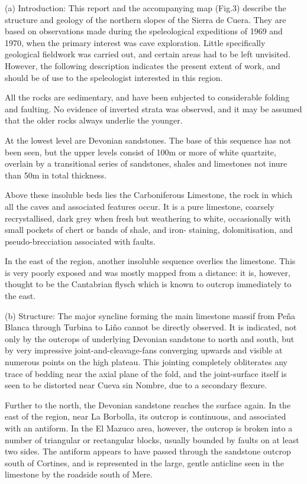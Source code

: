 \documentclass[11pt, a4paper, twoside]{memoir}
\begin{document}
(a) Introduction: This report and the accompanying map (Fig.3) describe the structure and geology of the northern slopes of the Sierra de Cuera. They are based on observations made during the speleological expeditions of 1969 and 1970, when the primary interest was cave exploration. Little specifically geological fieldwork was carried out, and certain areas had to be left unvisited. However, the following description indicates the present extent of work, and should be of use to the speleologist interested in this region.

All the rocks are sedimentary, and have been subjected to considerable folding and faulting. No evidence of inverted strata was observed, and it may be assumed that the older rocks always underlie the younger.

At the lowest level are Devonian sandstones. The base of this sequence has not been seen, but the upper levels consist of 100m or more of white quartzite, overlain by a transitional series of sandstones, shales and limestones not inure than 50m in total thickness.

Above these insoluble beds lies the Carboniferous Limestone, the rock in which all the caves and associated features occur. It is a pure limestone, coarsely recrystallised, dark grey when fresh but weathering to white, occasionally with small pockets of chert or bands of shale, and iron- staining, dolomitisation, and pseudo-brecciation associated with faults.

In the east of the region, another insoluble sequence overlies the limestone. This is very poorly exposed and was mostly mapped from a distance: it is, however, thought to be the Cantabrian flysch which is known to outcrop immediately to the east.

(b) Structure: The major syncline forming the main limestone massif from Peña Blanca through Turbina to Liño cannot be directly observed. It is indicated, not only by the outcrops of underlying Devonian sandstone to north and south, but by very impressive joint-and-cleavage-fans converging upwards and visible at numerous points on the high plateau. This jointing completely obliterates any trace of bedding near the axial plane of the fold, and the joint-surface itself is seen to be distorted near Cueva sin Nombre, due to a secondary flexure.

Further to the north, the Devonian sandstone reaches the surface again. In the east of the region, near La Borbolla, its outcrop is continuous, and associated with an antiform. In the El Mazuco area, however, the outcrop is broken into a number of triangular or rectangular blocks, usually bounded by faults on at least two sides. The antiform appears to have passed through the sandstone outcrop south of Cortines, and is represented in the large, gentle anticline seen in the limestone by the roadside south of Mere.
\end{document}
